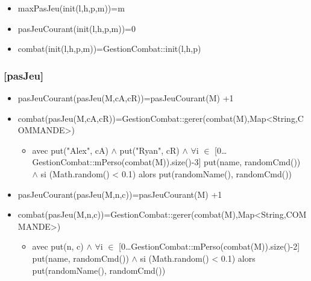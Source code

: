 \documentclass[11pt]{article}
\begin{document}
\begin{itemize}

\item maxPasJeu(init(l,h,p,m))=m\\
\label{sec-1.7.2.1}


\item pasJeuCourant(init(l,h,p,m))=0\\
\label{sec-1.7.2.2}


\item combat(init(l,h,p,m))=GestionCombat::init(l,h,p)\\
\label{sec-1.7.2.3}


\end{itemize} %
\subsubsection{[pasJeu]}
\label{sec-1.7.3}

\begin{itemize}

\item pasJeuCourant(pasJeu(M,cA,cR))=pasJeuCourant(M) +1\\
\label{sec-1.7.3.1}


\item combat(pasJeu(M,cA,cR))=GestionCombat::gerer(combat(M),Map<String,COMMANDE>)\\
\label{sec-1.7.3.2}

\begin{itemize}

\item avec put("Alex", cA) $\wedge$ put("Ryan", cR) $\wedge$ $\forall$i $\in$ [0\ldots{}GestionCombat::mPerso(combat(M)).size()-3] put(name, randomCmd()) $\wedge$ si (Math.random() < 0.1) alors put(randomName(), randomCmd())\\
\label{sec-1.7.3.2.1}


\end{itemize} %

\item pasJeuCourant(pasJeu(M,n,c))=pasJeuCourant(M) +1\\
\label{sec-1.7.3.3}


\item combat(pasJeu(M,n,c))=GestionCombat::gerer(combat(M),Map<String,COMMANDE>)\\
\label{sec-1.7.3.4}

\begin{itemize}

\item avec put(n, c) $\wedge$ $\forall$i $\in$ [0\ldots{}GestionCombat::mPerso(combat(M)).size()-2] put(name, randomCmd()) $\wedge$ si (Math.random() < 0.1) alors put(randomName(), randomCmd())\\
\label{sec-1.7.3.4.1}

\end{itemize} %
\end{itemize} %
\end{document}
